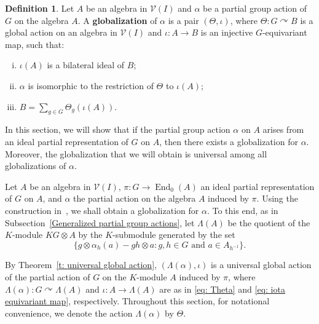 \documentclass[11pt]{amsart}
\numberwithin{equation}{section}
\theoremstyle{definition}
\newtheorem{definition}[theorem]{Definition}
\theoremstyle{remark}
\begin{document}
\begin{definition}\label{d: globalization of partial group actions}
    Let \(A\) be an algebra in \(\mathcal{V}(I)\) and \(\alpha\) be a partial group action of \(G\) on  the algebra  \(A\).
    A \textbf{globalization} of \(\alpha\) is a pair \((\Theta, \iota)\), where \(\Theta: G \curvearrowright B\) is a global action on an algebra in \(\mathcal{V}(I)\) and \(\iota: A \to B\) is an injective \(G\)-equivariant map, such that:
    \begin{enumerate}[(i)]
        \item \(\iota(A)\) is a bilateral ideal of \(B\);
        \item \(\alpha\) is isomorphic to the restriction of \(\Theta\) to \(\iota(A)\);
        \item \(B = \sum_{g \in G} \Theta_g(\iota(A))\).
    \end{enumerate}
\end{definition}

In this section, we will show that if the partial group action \(\alpha\) on \(A\) arises from an  ideal partial representation  of \(G\) on \(A\), then there exists a globalization for \(\alpha\).
Moreover, the globalization that we will obtain is universal among all globalizations of \(\alpha\).


Let \( A \) be an algebra in \( \mathcal{V}(I) \), \( \pi: G \to \operatorname{End}_0(A) \)  an  ideal partial representation of \( G \) on \(A\), and \( \alpha \) the partial action on the algebra \( A \) induced by \( \pi \). Using the construction in~\cite{Article_Jerez_2024_OTHOPGA}, we  shall obtain a globalization for \( \alpha \). To this end, as in Subsection~\ref{Generalized partial group actions}, let \( \Lambda(A) \) be the quotient of the \( K \)-module \( KG \otimes A \) by the \( K \)-submodule generated by the set 
\[
    \{ g \otimes \alpha_h(a) - gh \otimes a : g, h \in G \text{ and } a \in A_{h^{-1}} \}.
\]

By Theorem~\ref{t: universal global action}, \( (\Lambda(\alpha), \iota) \) is a universal global action of the partial action of \( G \) on the \( K \)-module \( A \) induced by \( \pi \), where \( \Lambda(\alpha): G \curvearrowright \Lambda(A) \) and \( \iota: A \to \Lambda(A) \) are as in \eqref{eq: Theta} and \eqref{eq: iota equivariant map}, respectively. Throughout this section, for  notational convenience, we denote the action \( \Lambda(\alpha) \) by \( \Theta \).
\end{document}
